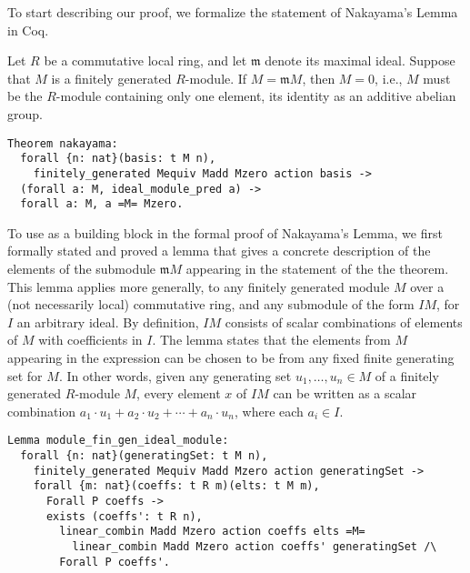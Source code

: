 \documentclass{article}
\begin{document}
To start describing our proof, we formalize the statement of Nakayama's Lemma in Coq.

\begin{nak*}
Let $R$ be a commutative local ring, and let $\mathfrak{m}$ denote its maximal
ideal. Suppose that $M$ is a finitely generated $R$-module. If
$M = \mathfrak{m} M$, then $M = 0$, i.e., $M$ must be the $R$-module containing
only one element, its identity as an additive abelian group. 
\end{nak*}

\begin{verbatim}
Theorem nakayama:
  forall {n: nat}(basis: t M n),
    finitely_generated Mequiv Madd Mzero action basis ->
  (forall a: M, ideal_module_pred a) ->
  forall a: M, a =M= Mzero.
\end{verbatim}

To use as a building block in the formal proof of Nakayama's Lemma, we first formally stated and proved a lemma that gives a concrete description of the elements of the submodule $\mathfrak{m} M$  appearing in the statement of the the theorem.  
This lemma applies more generally, to any finitely generated module $M$ over a (not necessarily local) commutative ring, and any submodule of the form $IM$, for $I$ an arbitrary ideal. 
By definition, $IM$ consists of scalar combinations of elements of $M$ with coefficients in $I$. 
The lemma states that the elements from $M$ appearing in the expression can be chosen to be from any 
 fixed finite generating set for $M$. 
In other words, given any generating set  $u_{1},\dots, u_{n} \in M$  of a  finitely generated $R$-module $M$, every element $x$ of $I M$ can be written as a scalar combination $a_1 \cdot u_1 + a_2  \cdot u_2 + \cdots + a_n  \cdot u_n$, where each $a_i \in I$. 

\begin{verbatim}
Lemma module_fin_gen_ideal_module:
  forall {n: nat}(generatingSet: t M n),
    finitely_generated Mequiv Madd Mzero action generatingSet ->
    forall {m: nat}(coeffs: t R m)(elts: t M m),
      Forall P coeffs ->
      exists (coeffs': t R n),
        linear_combin Madd Mzero action coeffs elts =M=
          linear_combin Madd Mzero action coeffs' generatingSet /\
        Forall P coeffs'.
\end{verbatim}        
\end{document}
